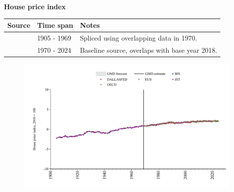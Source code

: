 \documentclass[12pt,a4paper,landscape]{article}
\begin{document}
\begin{adjustbox}{max totalsize={\paperwidth}{\paperheight},center}
\begin{minipage}[t][\textheight][t]{\textwidth}
\vspace*{0.5cm}
{}
\begin{center}
{\Large\bfseries House price index}
\end{center}
\vspace{0.5cm}
\begin{table}[H]
\centering
\small
\begin{tabular}{|l|l|l|}
\hline
\textbf{Source} & \textbf{Time span} & \textbf{Notes} \\
\hline
\rowcolor{white}\cite{JST}& 1905 - 1969 &Spliced using overlapping data in 1970. \\
\rowcolor{lightgray}\cite{BIS}& 1970 - 2024 &Baseline source, overlaps with base year 2018. \\
\hline
\end{tabular}
\end{table}
\begin{figure}[H]
\centering
\includegraphics[width=\textwidth,height=0.6\textheight,keepaspectratio]{graphs/FIN_HPI.pdf}
\end{figure}
\end{minipage}
\end{adjustbox}
\end{document}
